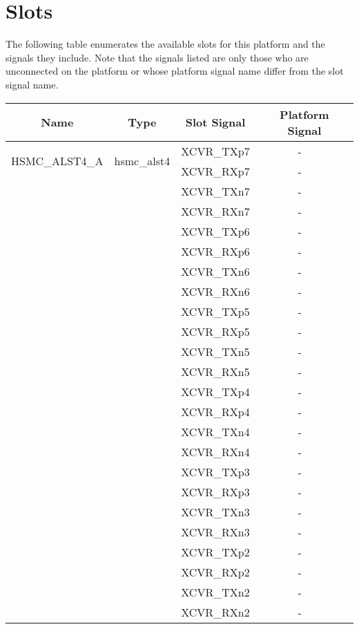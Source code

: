 \section*{Slots}
The following table enumerates the available slots for this platform and the signals they include. Note that the signals listed are only those who are unconnected on the platform or whose platform signal name differ from the slot signal name. \\
\begin{longtable}[l]{|c|c|c|c|}
	\hline
	\rowcolor{blue}
	Name           & Type & Slot Signal & Platform Signal  \\
	\hline
	\multirow{2}{*}{HSMC\_ALST4\_A} & \multirow{2}{*}{hsmc\_alst4} & XCVR\_TXp7 & -  \
  \\\cline{3-4}
  & & XCVR\_RXp7 & - \
  \\\cline{3-4}
  & & XCVR\_TXn7 & - \
  \\\cline{3-4}
  & & XCVR\_RXn7 & - \
  \\\cline{3-4}
  & & XCVR\_TXp6 & - \
  \\\cline{3-4}
  & & XCVR\_RXp6 & - \
  \\\cline{3-4}
  & & XCVR\_TXn6 & - \
  \\\cline{3-4}
  & & XCVR\_RXn6 & - \
  \\\cline{3-4}
  & & XCVR\_TXp5 & - \
  \\\cline{3-4}
  & & XCVR\_RXp5 & - \
  \\\cline{3-4}
  & & XCVR\_TXn5 & - \
  \\\cline{3-4}
  & & XCVR\_RXn5 & - \
  \\\cline{3-4}
  & & XCVR\_TXp4 & - \
  \\\cline{3-4}
  & & XCVR\_RXp4 & - \
  \\\cline{3-4}
  & & XCVR\_TXn4 & - \
  \\\cline{3-4}
  & & XCVR\_RXn4 & - \
  \\\cline{3-4}
  & & XCVR\_TXp3 & - \
  \\\cline{3-4}
  & & XCVR\_RXp3 & - \
  \\\cline{3-4}
  & & XCVR\_TXn3 & - \
  \\\cline{3-4}
  & & XCVR\_RXn3 & - \
  \\\cline{3-4}
  & & XCVR\_TXp2 & - \
  \\\cline{3-4}
  & & XCVR\_RXp2 & - \
  \\\cline{3-4}
  & & XCVR\_TXn2 & - \
  \\\cline{3-4}
  & & XCVR\_RXn2 & - \
  \\\cline{3-4}

\end{longtable}
